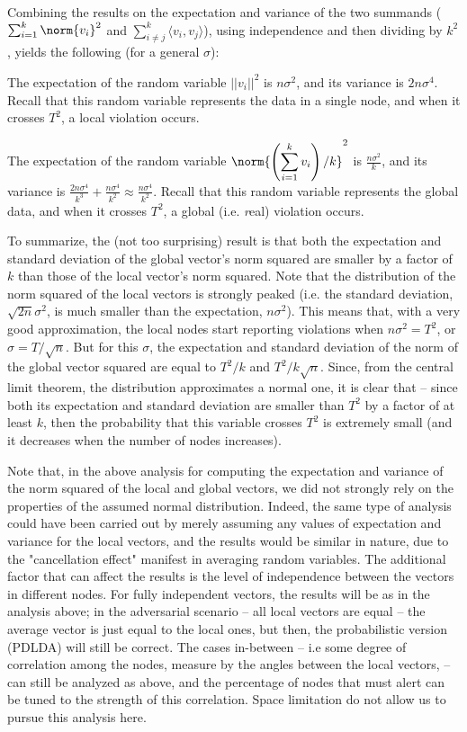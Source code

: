 Combining the results on the expectation and variance of the two summands
($\sum_{i=1}^k \norm{v_i}^2$ and $\sum_{i \neq j}^k \langle v_i , v_j\rangle$),
using independence and then dividing by $k^2$, yields the following (for a 
general $\sigma$):

\begin{lemma}
\label{lemma:Gaussian}
The expectation of the random variable $||v_i||^2$ is $n\sigma^2$, and its
variance is $2n\sigma^4$. Recall that this random variable represents the
data in a single node, and when it crosses $T^2$, a local violation occurs. 


The expectation of the random variable
\(\norm{\left(\displaystyle \sum_{i=1}^k v_i\right)/k}^2\) is
$\frac{n\sigma^2}{k}$, and its variance is 
$\frac{2n\sigma^4}{k^3} + \frac{n\sigma^4}{k^2} \approx \frac{n\sigma^4}{k^2}$.
Recall that this random variable represents the
global data, and when it crosses $T^2$, a global (i.e. {\emph real}) violation occurs. 
\end{lemma}

To summarize, the (not too surprising) result is that both the expectation and
standard deviation of the global vector's norm squared are smaller by a factor of $k$ than those of the local vector's norm squared. Note that the distribution of the norm
squared of the local vectors is strongly peaked (i.e. the standard deviation,
$\sqrt{2n}\sigma^2$, is much smaller than the expectation, $n\sigma^2$). This means
that, with a very good approximation, the local nodes start reporting violations
when $n\sigma^2=T^2$, or $\sigma = T/\sqrt{n}$. But for this $\sigma$, the 
expectation and standard deviation of the norm of the global vector squared
are equal to $T^2/k$ and $T^2/k\sqrt{n}$. Since, from the central limit theorem,
the distribution approximates a normal one, it is clear that -- since both its
expectation and standard deviation are smaller than $T^2$ by a factor of at least
$k$, then the probability that this variable crosses $T^2$ is extremely small (and
it decreases when the number of nodes increases).

Note that, in the above analysis for computing the expectation and variance
of the norm squared of the local and global vectors, we did not strongly rely
on the properties of the assumed normal distribution. Indeed, the same type
of analysis could have been carried out by merely assuming any values of
expectation and variance for the local vectors, and the results would be
similar in nature, due to the "cancellation effect" manifest in averaging
random variables. The additional factor that can affect the results is the
level of independence between the vectors in different nodes. For fully
independent vectors, the results will be as in the analysis above; in the
adversarial scenario -- all local vectors are equal -- the average vector is just
equal to the local ones, but then, the probabilistic version (PDLDA) will
still be correct. The cases in-between -- i.e some degree of correlation
among the nodes, 
measure by the angles between the local vectors, -- can still be analyzed
as above, and the percentage of nodes that must alert can be tuned to
the strength of this correlation. Space limitation do not allow us to 
pursue this analysis here.
